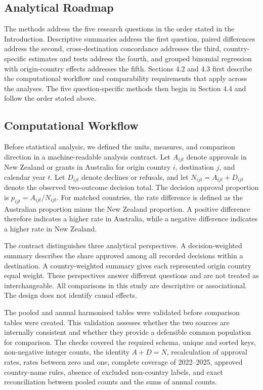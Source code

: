 \documentclass[runningheads]{llncs}
\begin{document}
\subsection{Analytical Roadmap}

The methods address the five research questions in the order stated in the Introduction. Descriptive summaries address the first question, paired differences address the second, cross-destination concordance addresses the third, country-specific estimates and tests address the fourth, and grouped binomial regression with origin-country effects addresses the fifth. Sections 4.2 and 4.3 first describe the computational workflow and comparability requirements that apply across the analyses. The five question-specific methods then begin in Section 4.4 and follow the order stated above.

\subsection{Computational Workflow}

Before statistical analysis, we defined the units, measures, and comparison direction in a machine-readable analysis contract. Let $A_{ijt}$ denote approvals in New Zealand or grants in Australia for origin country $i$, destination $j$, and calendar year $t$. Let $D_{ijt}$ denote declines or refusals, and let $N_{ijt}=A_{ijt}+D_{ijt}$ denote the observed two-outcome decision total. The decision approval proportion is $p_{ijt}=A_{ijt}/N_{ijt}$. For matched countries, the rate difference is defined as the Australian proportion minus the New Zealand proportion. A positive difference therefore indicates a higher rate in Australia, while a negative difference indicates a higher rate in New Zealand.

The contract distinguishes three analytical perspectives. A decision-weighted summary describes the share approved among all recorded decisions within a destination. A country-weighted summary gives each represented origin country equal weight. These perspectives answer different questions and are not treated as interchangeable. All comparisons in this study are descriptive or associational. The design does not identify causal effects.

The pooled and annual harmonised tables were validated before comparison tables were created. This validation assesses whether the two sources are internally consistent and whether they provide a defensible common population for comparison. The checks covered the required schema, unique and sorted keys, non-negative integer counts, the identity $A+D=N$, recalculation of approval rates, rates between zero and one, complete coverage of 2022--2025, approved country-name rules, absence of excluded non-country labels, and exact reconciliation between pooled counts and the sums of annual counts.
\end{document}
